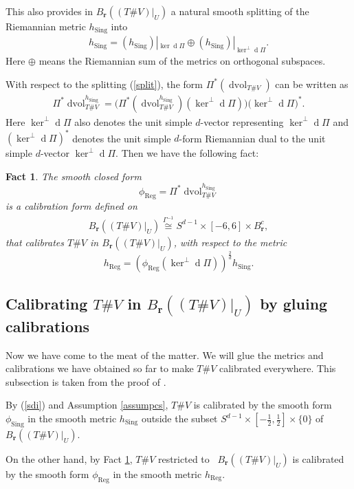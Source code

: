 \documentclass[11pt,a4paper]{amsart}
\numberwithin{equation}{section}
\newcommand{\reg}{{\operatorname{Reg}}}
\newcommand{\sing}{{\operatorname{Sing}}}
\newcommand{\Ga}{\Gamma}
\newcommand{\dvol}{\operatorname{dvol}}
\newcommand{\ed}{{\operatorname{d}}}
\newcommand{\du}{^\ast}
\newcommand{\m}{^{-1}}
\newcommand{\mfr}{{\mathbf{r}}}
\newcommand{\tvu}{(T\#V)|_U}
\newcommand{\ur}{B_{\mfr}(\tvu)}
\theoremstyle{plain}
\newtheorem{fact}[exam]{Fact}
\theoremstyle{definition}
\numberwithin{equation}{subsection}
\begin{document}
	This also provides in $\ur$ a natural smooth splitting of the Riemannian metric $h_\sing$ into
	\begin{align*}
		h_\sing=(h_\sing)|_{\ker \ed\Pi}\oplus(h_\sing)|_{\ker^\perp \ed\Pi}.
	\end{align*}Here $\oplus$ means the Riemannian sum of the metrics on orthogonal subspaces. 
	
	With respect to the splitting (\ref{split}), the form ${\Pi}\du(\dvol_{T\#V})$ can be written as
	\begin{align*}
		{\Pi}\du\dvol_{T\#V}^{h_\sing}=\big({\Pi}\du(\dvol_{T\#V}^{h_\sing})(\ker^\perp \ed\Pi)\big)\big(\ker^\perp \ed\Pi\big)\du.
	\end{align*}Here $\ker^\perp \ed\Pi$ also denotes the unit simple $d$-vector representing $\ker^\perp \ed\Pi$ and
	$(\ker^\perp \ed\Pi)\du$ denotes the unit simple $d$-form Riemannian dual to the unit simple $d$-vector $\ker^\perp \ed\Pi.$ Then we have the following fact:
	\begin{fact}\label{calreg}
		The smooth closed form $$\phi_\reg={\Pi}\du\dvol^{h_\sing}_{T\#V}$$ is a calibration form defined on
		\begin{align}\label{ureq}		\ur\overset{\Ga\m}{\cong} S^{d-1}\times[-6,6]\times B_\mfr^{c},
		\end{align} that calibrates $ T\#V$ in	$\ur$, with respect to the metric
		$$h_\reg=(\phi_\reg(\ker^\perp \ed\Pi))^{\frac{2}{d}}h_{\sing}.$$
	\end{fact}
	\subsection{Calibrating $T\#V$ in $\ur$ by gluing calibrations}
	Now we have come to the meat of the matter. We will glue the metrics and calibrations we have obtained so far to make $T\#V$ calibrated everywhere. This subsection is taken from the proof of \cite[Theorem 4.6]{YZa}.   
	
	By (\ref{sdi}) and Assumption \ref{assumpcs}, $T\# V$ is calibrated by the smooth form $\phi_\sing$ in the smooth metric $h_\sing$ outside the subset $S^{d-1}\times[-\frac{1}{2},\frac{1}{2}]\times\{0\}$ of $\ur.$
	
	On the other hand, by Fact \ref{calreg}, $T\# V$ restricted to  $\ur$ is calibrated by the smooth form $\phi_\reg$ in the smooth metric $h_\reg$.
	
\end{document}
